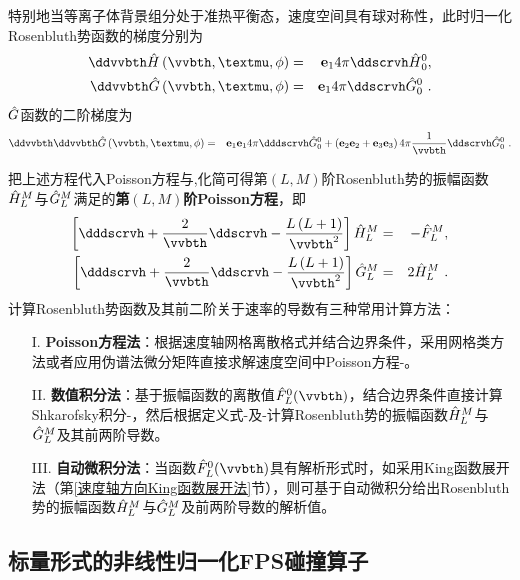   特别地当等离子体背景组分处于准热平衡态，速度空间具有球对称性，此时归一化Rosenbluth势函数的梯度分别为
  \begin{eqnarray}
      \ddvvbth  \Hh \left (\vvbth,\mu,\phi \right) &=& \ex 4\pi \ddscrvh \Hho, \label{ddHh1} 
      \\
      \ddvvbth  \Gh \left (\vvbth,\mu,\phi \right) &=& \ex  4\pi  \ddscrvh \Gho  ~. \label{ddGh1}
  \end{eqnarray}
  $\hat{G}$函数的二阶梯度为
  \begin{eqnarray}
      \ddvvbth \ddvvbth  \Gh \left (\vvbth,\mu,\phi \right) &= & \ex \ex 4\pi  \dddscrvh \Gho + 
      \left ( \ey \ey + \ez \ez \right) 4\pi  \frac{1}{\vvbth} \ddscrvh \Gho ~.  \label{dddGh1} 
  \end{eqnarray}
  
  把上述方程代入Poisson方程与,化简可得第$(L,M)$阶Rosenbluth势的振幅函数$\hat{H}_L^M$与$\hat{G}_L^M$满足的\textbf{第$(L,M)$阶Poisson方程}，即
  \begin{eqnarray}
      \left[ \dddscrvh + \frac{2}{\vvbth} \ddscrvh -\frac{L \left(L + 1\right)}{\vvbth ^2} \right] \Hhlm &=& - \Fhlm , \label{PoissonHhLM} \\
      \left[ \dddscrvh + \frac{2}{\vvbth} \ddscrvh -\frac{L \left(L + 1\right)}{\vvbth ^2} \right] \Ghlm &=& 2 \Hhlm ~. \label{PoissonGhLM}
  \end{eqnarray}
  计算Rosenbluth势函数及其前二阶关于速率的导数有三种常用计算方法：
  \begin{itemize}
      \item [I.] \textbf{Poisson方程法}：根据速度轴网格离散格式并结合边界条件，采用网格类方法或者应用伪谱法微分矩阵直接求解速度空间中Poisson方程-。
      
      \item [II.] \textbf{数值积分法}：基于振幅函数的离散值$\FhL (\vvbth)$，结合边界条件直接计算Shkarofsky积分-，然后根据定义式-及-计算Rosenbluth势的振幅函数$\hat{H}_L^M$与$\hat{G}_L^M$及其前两阶导数。
      
      \item [III.] \textbf{自动微积分法}：当函数$\FhL (\vvbth)$具有解析形式时，如采用King函数展开法（第\ref{速度轴方向King函数展开法}节），则可基于自动微积分给出Rosenbluth势的振幅函数$\hat{H}_L^M$与$\hat{G}_L^M$及前两阶导数的解析值。
  \end{itemize}
  
  \subsection{标量形式的非线性归一化FPS碰撞算子}
  \label{标量形式的非线性归一化FPS碰撞算子}

